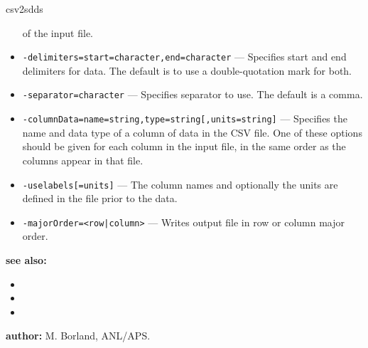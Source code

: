 \begin{sddsprog}{csv2sdds}
\begin{itemize}
        of the input file.
      \item \verb|-delimiters=start=character,end=character| --- Specifies start and end
        delimiters for data. The default is to use a double-quotation mark for both.
      \item \verb|-separator=character| --- Specifies separator to use. The default is a comma.
      \item \verb|-columnData=name=string,type=string[,units=string]| ---
        Specifies the name and data
        type of a column of data in the CSV file. One of these options should be given for each
        column in the input file, in the same order as the columns appear in that file.
      \item \verb|-uselabels[=units]| --- The column names and optionally the units are defined in the
        file prior to the data.
      \item \verb!-majorOrder=<row|column>! --- Writes output file in row or column major order.
    \end{itemize}
  \item {\bf see also:}
    \begin{itemize}
      \item {}
      \item {}
      \item {}
    \end{itemize}
  \item {\bf author:} M. Borland, ANL/APS.
\end{sddsprog}

